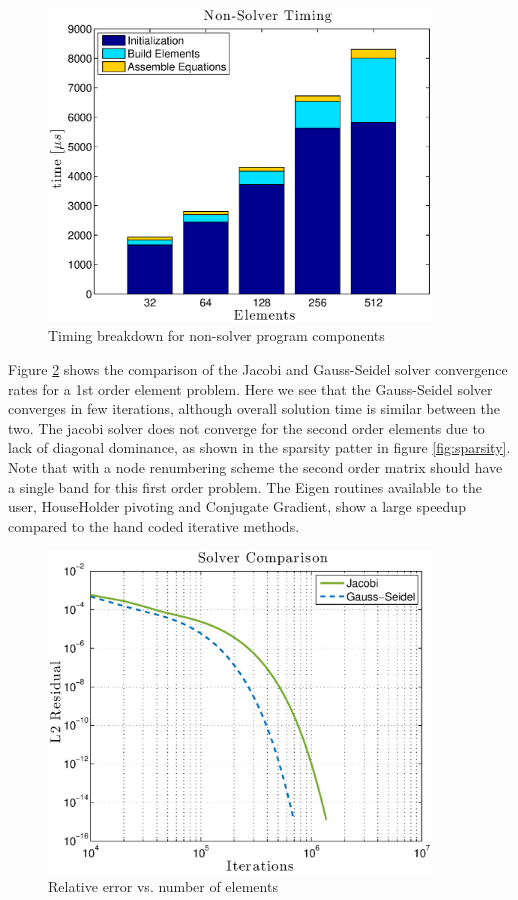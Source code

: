 \documentclass[12pt]{article}
\begin{document}
\begin{figure}[H] %
   \centering
   \includegraphics[width=4in]{other_timing.eps} 
   \caption{Timing breakdown for non-solver program components}
   \label{fig:int_error}
\end{figure}

Figure \ref{fig:solvers} shows the comparison of the Jacobi and Gauss-Seidel solver convergence rates for a 1st order element problem.  Here we see that the Gauss-Seidel solver converges in few iterations, although overall solution time is similar between the two.  The jacobi solver does not converge for the second order elements due to lack of diagonal dominance, as shown in the sparsity patter in figure \ref{fig:sparsity}.  Note that with a node renumbering scheme the second order matrix should have a single band for this first order problem.  The Eigen routines available to the user, HouseHolder pivoting and Conjugate Gradient, show a large speedup compared to the hand coded iterative methods.

\begin{figure}[!htbp] %
   \centering
   \includegraphics[width=4in]{solver_convergence.eps} 
   \caption{Relative error vs. number of elements}
   \label{fig:solvers}
\end{figure}
\end{document}
